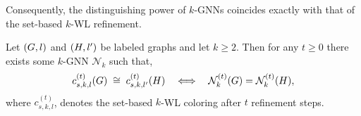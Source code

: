 Consequently, the distinguishing power of $k$-GNNs coincides exactly with that of the set-based $k$-WL refinement.


\begin{proposition}
\label{prop:kGNN-iff-kWL}
Let $(G,l)$ and $(H,l')$ be labeled graphs and let $k \ge 2$. Then for any $t \ge 0$ there exists some $k$-GNN $\mathcal{N}_k$ such that,
\[
c^{(t)}_{s,k,l}(G) \;\cong\; c^{(t)}_{s,k,l'}(H)
\quad\Longleftrightarrow\quad
\mathcal{N}_k^{(t)}(G) = \mathcal{N}_k^{(t)}(H),
\]
where $c^{(t)}_{s,k,l}$, denotes the set-based $k$-WL coloring after $t$ refinement steps.
\end{proposition}







